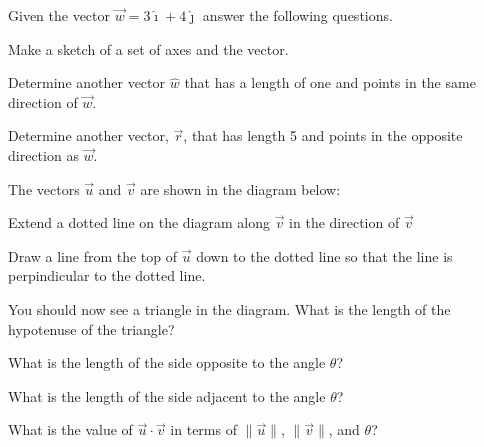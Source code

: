 \begin{problem}
  \item Given the vector $\vec{w}=3\hat{\imath} +4 \hat{\jmath}$ answer the following questions.

    \begin{subproblem}
        \item Make a sketch of a set of axes and the vector.
        \vfill
        \item Determine another vector $\hat{w}$ that has a length of one and points in the same direction of $\vec{w}$.
        \vfill
        \item Determine another vector, $\vec{r}$, that has length 5 and points in the opposite direction as $\vec{w}$.
        \vfill
    \end{subproblem}

    \clearpage

  \item The vectors $\vec{u}$ and $\vec{v}$ are shown in the diagram below:


  \begin{subproblem}
    \item Extend a dotted line on the diagram along $\vec{v}$ in the direction of $\vec{v}$
    \item Draw a line from the top of $\vec{u}$ down to the dotted line so that the line is perpindicular to the dotted line.
    \item You should now see a triangle in the diagram. What is the length of the hypotenuse of the triangle?
      \vfill
    \item What is the length of the side opposite to the angle $\theta$?
      \vfill
    \item What is the length of the side adjacent to the angle $\theta$?
      \vfill

      \clearpage

    \item What is the value of $\vec{u}\cdot\vec{v}$ in terms of $\|\vec{u}\|$, $\|\vec{v}\|$, and $\theta$?
      \vfill


\end{subproblem}
\end{problem}
